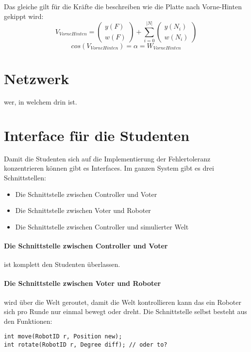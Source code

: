 \documentclass[
    12pt,
    bibliography=totoc,
    ngerman
]{scrartcl}
\begin{document}
Das gleiche gilt f{\"{u}}r die Kr{\"{a}}fte die beschreiben wie die Platte nach Vorne-Hinten gekippt wird:
$$ V_{VorneHinten} = \begin{pmatrix}y(F) \\ w(F) \end{pmatrix} + \sum_{i=0}^{|N|} \begin{pmatrix} y(N_i) \\ w(N_i) \end{pmatrix} $$
$$ cos(V_{VorneHinten}) = \alpha = W_{VorneHinten} $$

\clearpage
\section{Netzwerk}
wer, in welchem drin ist. 

\clearpage
\section{Interface f{\"{u}}r die Studenten}
Damit die Studenten sich auf die Implementierung der Fehlertoleranz konzentrieren k{\"{o}}nnen gibt es Interfaces.  
Im ganzen System gibt es drei Schnittstellen:
\begin{itemize}
\item Die Schnittstelle zwischen Controller und Voter
\item Die Schnittstelle zwischen Voter und Roboter
\item Die Schnittstelle zwischen Controller und simulierter Welt 
\end{itemize}

\paragraph{Die Schnittstelle zwischen Controller und Voter} ist komplett den Studenten {\"{u}}berlassen.

\paragraph{Die Schnittstelle zwischen Voter und Roboter} wird {\"{u}}ber die Welt geroutet, damit die Welt kontrollieren kann das ein
Roboter sich pro Runde nur einmal bewegt oder dreht. Die Schnittstelle selbst besteht aus den Funktionen:
\begin{lstlisting}
int move(RobotID r, Position new);
int rotate(RobotID r, Degree diff); // oder to?
\end{lstlisting}
\end{document}

